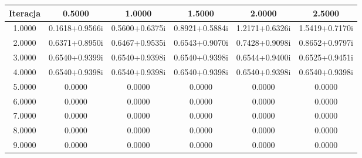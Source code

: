 \documentclass[a4paper, 11pt]{article}
\begin{document}
\begin{enumerate}
\begin{itemize}
\begin{table}                                                                                 
\centering                                                                                    
\begin{tabular}{|c|c|c|c|c|c|}                                                                
\hline                                                                                        
Iteracja & 0.5000 & 1.0000 & 1.5000 & 2.0000 & 2.5000 \\                                        
\hline                                                                                        
1.0000 & 0.1618+0.9566i & 0.5600+0.6375i & 0.8921+0.5884i & 1.2171+0.6326i & 1.5419+0.7170i \\
\hline                                                                                        
2.0000 & 0.6371+0.8950i & 0.6467+0.9535i & 0.6543+0.9070i & 0.7428+0.9098i & 0.8652+0.9797i \\
\hline                                                                                        
3.0000 & 0.6540+0.9399i & 0.6540+0.9398i & 0.6540+0.9398i & 0.6544+0.9400i & 0.6525+0.9451i \\
\hline                                                                                        
4.0000 & 0.6540+0.9398i & 0.6540+0.9398i & 0.6540+0.9398i & 0.6540+0.9398i & 0.6540+0.9398i \\
\hline                                                                                        
5.0000 & 0.0000 & 0.0000 & 0.0000 & 0.0000 & 0.0000 \\                                        
\hline                                                                                        
6.0000 & 0.0000 & 0.0000 & 0.0000 & 0.0000 & 0.0000 \\                                        
\hline                                                                                        
7.0000 & 0.0000 & 0.0000 & 0.0000 & 0.0000 & 0.0000 \\                                        
\hline                                                                                        
8.0000 & 0.0000 & 0.0000 & 0.0000 & 0.0000 & 0.0000 \\                                        
\hline                                                                                        
9.0000 & 0.0000 & 0.0000 & 0.0000 & 0.0000 & 0.0000 \\                                        

\end{tabular}
\end{table}
\end{itemize}
\end{enumerate}
\end{document}
